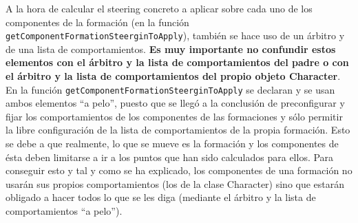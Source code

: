 A la hora de calcular el steering concreto a aplicar sobre cada uno de los componentes de la formación (en la función \texttt{getComponentFormationSteerginToApply}), también se hace uso de un árbitro y de una lista de comportamientos. \textbf{Es muy importante no confundir estos elementos con el árbitro y la lista de comportamientos del padre o con el árbitro y la lista de comportamientos del propio objeto Character}. En la función \texttt{getComponentFormationSteerginToApply} se declaran y se usan ambos elementos ``a pelo'', puesto que se llegó a la conclusión de preconfigurar y fijar los comportamientos de los componentes de las formaciones y sólo permitir la libre configuración de la lista de comportamientos de la propia formación. Esto se debe a que realmente, lo que se mueve es la formación y los componentes de ésta deben limitarse a ir a los puntos que han sido calculados para ellos. Para conseguir esto y tal y como se ha explicado, los componentes de una formación no usarán sus propios comportamientos (los de la clase Character) sino que estarán obligado a hacer todos lo que se les diga (mediante el árbitro y la lista de comportamientos ``a pelo'').

